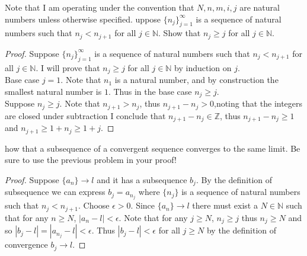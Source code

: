 \documentclass[12pt]{article}
\makeatletter
\theoremstyle{homework}
\newenvironment{exercise}[1]
{\def\@currentlabel{#1}\exercisecore}
{\endexercisecore}
\makeatother
\begin{document}
Note that I am operating under the convention that $N,n,m,i,j$ are natural numbers unless otherwise specified.
\begin{exercise}

Suppose $\{n_j\}_{j=1}^\infty$ is a sequence of natural numbers such that $n_j < n_{j+1}$ for all $j \in \mathbb{N}$.  Show that $n_j \geq j$ for all $j \in \mathbb{N}$.
\end{exercise}
\begin{proof}
Suppose $\{n_j\}_{j=1}^\infty$ is a sequence of natural numbers such that $n_j < n_{j+1}$ for all $j \in \mathbb{N}$.  I will prove that $n_j \geq j$ for all $j \in \mathbb{N}$ by induction on $j$.\\
Base case $j=1$.  Note that $n_1$ is a natural number, and by construction the smallest natural number is $1$.  Thus in the base case $n_j \geq j$.\\
Suppose $n_j \geq j$.  Note that $n_{j+1}>n_j$, thus $n_{j+1}-n_j>0$,noting that the integers are closed under subtraction I conclude that $n_{j+1}-n_j\in\mathbb{Z}$, thus $n_{j+1}-n_j\geq 1$ and $n_{j+1}\geq 1+n_j\geq 1+j$.
\end{proof}

\begin{exercise}

Show that a subsequence of a convergent sequence converges to the same limit. Be sure
to use the previous problem in your proof!
\end{exercise}
\begin{proof}
Suppose $\{a_n\} \rightarrow l$ and it has a subsequence $b_j$.  By the definition of subsequence we can express $b_j=a_{n_j}$ where $\{n_j\}$ is a sequence of natural numbers such that $n_j < n_{j+1}$.  Choose $\epsilon>0$.  Since $\{a_n\} \rightarrow l$ there must exist a $N\in\mathbb{N}$ such that for any $n\geq N$, $|a_n-l|<\epsilon$.  Note that for any $j\geq N$, $n_j\geq j$ thus $n_j\geq N$ and so $|b_{j}-l|=|a_{n_j}-l|<\epsilon$.  Thus $|b_{j}-l|<\epsilon$ for all $j\geq N$ by the definition of convergence $b_j\rightarrow l$.
\end{proof}
\end{document}
